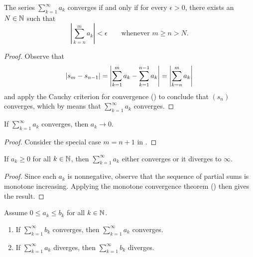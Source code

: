 \begin{theorem}
  The series $\sum_{k = 1}^{\infty} a_k$ converges if and only if for
  every $\epsilon > 0$, there exists an $N \in \mathbb N$ such that
  \[ \left|\sum_{k = n}^{m} a_k\right| < \epsilon \qquad
  \text{whenever $m \geq n > N$.}\]
\end{theorem}

\begin{proof}
  Observe that
  \[ | s_m - s_{n - 1} | = \left|\sum_{k = 1}^{m} a_k - \sum_{k =
  1}^{n - 1} a_k\right| = \left|\sum_{k = n}^{m} a_k\right| \]
  and apply the Cauchy criterion for convergence
  () to conclude that
  $(s_n)$ converges, which by 
  means that $\sum_{k = 1}^{\infty} a_k$ converges.
\end{proof}

\begin{theorem}
  If $\sum_{k = 1}^{\infty} a_k$ converges, then $a_k \to 0$.
\end{theorem}

\begin{proof}
  Consider the special case $m = n + 1$ in .
\end{proof}

\begin{proposition}
  If $a_k \geq 0$ for all $k \in \mathbb N$, then $\sum_{k = 1}^{\infty}
  a_k$ either converges or it diverges to $\infty$.
\end{proposition}

\begin{proof}
  Since each $a_k$ is nonnegative, observe that the sequence of
  partial sums is monotone increasing. Applying the monotone
  convergence theorem () then gives the result.
\end{proof}

\begin{proposition}
  Assume $0 \leq a_k \leq b_k$ for all $k \in \mathbb N$.
  \begin{enumerate}
    \item If $\sum_{k = 1}^{\infty} b_k$ converges, then $\sum_{k =
      1}^{\infty} a_k$ converges.
    \item If $\sum_{k = 1}^{\infty} a_k$ diverges, then $\sum_{k =
      1}^{\infty} b_k$ diverges.
  \end{enumerate}
\end{proposition}

